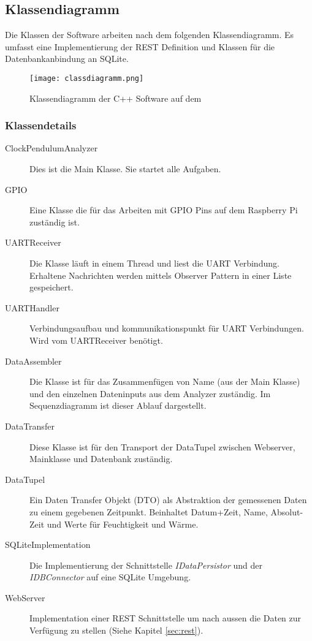 \subsection{Klassendiagramm}
Die Klassen der Software arbeiten nach dem folgenden Klassendiagramm. Es umfasst eine Implementierung der REST Definition und Klassen für die Datenbankanbindung an SQLite.
\begin{figure}[H]
    \centering
    \texttt{[image: classdiagramm.png]}
    \caption{Klassendiagramm der C++ Software auf dem \rpi}
\end{figure}
\subsubsection{Klassendetails}
	\begin{description}
        \item[ClockPendulumAnalyzer] Dies ist die Main Klasse. Sie startet alle Aufgaben.
        \item[GPIO] Eine Klasse die für das Arbeiten mit GPIO Pins auf dem Raspberry Pi zuständig ist.
        \item[UARTReceiver] Die Klasse läuft in einem Thread und liest die UART Verbindung. Erhaltene Nachrichten werden mittels Observer Pattern in einer Liste gespeichert.
        \item[UARTHandler] Verbindungsaufbau und kommunikationspunkt für UART Verbindungen. Wird vom UARTReceiver benötigt.
        \item[DataAssembler] Die Klasse ist für das Zusammenfügen von Name (aus der Main Klasse) und den einzelnen Dateninputs aus dem Analyzer zuständig. Im Sequenzdiagramm ist dieser Ablauf dargestellt. 
        \item[DataTransfer] Diese Klasse ist für den Transport der DataTupel zwischen Webserver, Mainklasse und Datenbank zuständig.
        \item[DataTupel] Ein Daten Transfer Objekt (DTO) als Abstraktion der gemessenen Daten zu einem gegebenen Zeitpunkt. Beinhaltet Datum+Zeit, Name, Absolut-Zeit und Werte für Feuchtigkeit und Wärme.
        \item[SQLiteImplementation] Die Implementierung der Schnittstelle \textit{IDataPersistor} und der \textit{IDBConnector} auf eine SQLite Umgebung.
        \item[WebServer] Implementation einer REST Schnittstelle um nach aussen die Daten zur Verfügung zu stellen (Siehe Kapitel \ref{sec:rest}).
    \end{description}
